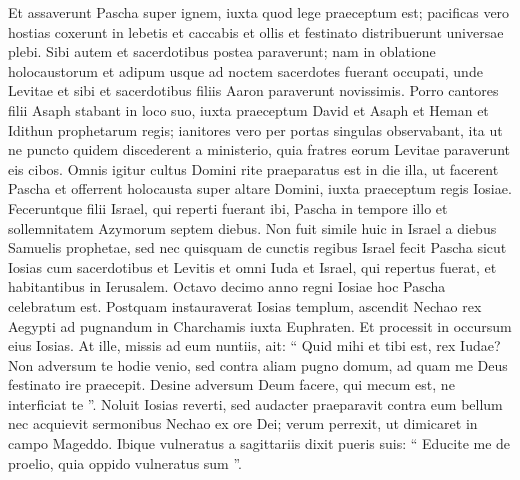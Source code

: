 \begin{biblechapter}
\begin{biblechapter}
\begin{biblechapter}
\begin{biblechapter}
\begin{biblechapter}
\begin{biblechapter}
\begin{biblechapter}
\begin{biblechapter}
\begin{biblechapter}
\begin{biblechapter}
\begin{biblechapter}
\begin{biblechapter}
\begin{biblechapter}
\begin{biblechapter}
\begin{biblechapter}
\begin{biblechapter}
\begin{biblechapter}
\begin{biblechapter}
\begin{biblechapter}
\begin{biblechapter}
\begin{biblechapter}
\begin{biblechapter}
\begin{biblechapter}
\begin{biblechapter}
\begin{biblechapter}
\begin{biblechapter}
\begin{biblechapter}
\begin{biblechapter}
\begin{biblechapter}
\begin{biblechapter}
\begin{biblechapter}
\begin{biblechapter}
\begin{biblechapter}
\begin{biblechapter}
\begin{biblechapter}
\verse Et assaverunt Pascha super ignem, iuxta quod lege praeceptum est; pacificas vero hostias coxerunt in lebetis et caccabis et ollis et festinato distribuerunt universae plebi. 
\verse Sibi autem et sacerdotibus postea paraverunt; nam in oblatione holocaustorum et adipum usque ad noctem sacerdotes fuerant occupati, unde Levitae et sibi et sacerdotibus filiis Aaron paraverunt novissimis. 
\verse Porro cantores filii Asaph stabant in loco suo, iuxta praeceptum David et Asaph et Heman et Idithun prophetarum regis; ianitores vero per portas singulas observabant, ita ut ne puncto quidem discederent a ministerio, quia fratres eorum Levitae paraverunt eis cibos.
 \verse Omnis igitur cultus Domini rite praeparatus est in die illa, ut facerent Pascha et offerrent holocausta super altare Domini, iuxta praeceptum regis Iosiae. 
\verse Feceruntque filii Israel, qui reperti fuerant ibi, Pascha in tempore illo et sollemnitatem Azymorum septem diebus. 
\verse Non fuit simile huic in Israel a diebus Samuelis prophetae, sed nec quisquam de cunctis regibus Israel fecit Pascha sicut Iosias cum sacerdotibus et Levitis et omni Iuda et Israel, qui repertus fuerat, et habitantibus in Ierusalem. 
\verse Octavo decimo anno regni Iosiae hoc Pascha celebratum est.
 \verse Postquam instauraverat Iosias templum, ascendit Nechao rex Aegypti ad pugnandum in Charchamis iuxta Euphraten. Et processit in occursum eius Iosias. 
\verse At ille, missis ad eum nuntiis, ait: “ Quid mihi et tibi est, rex Iudae? Non adversum te hodie venio, sed contra aliam pugno domum, ad quam me Deus festinato ire praecepit. Desine adversum Deum facere, qui mecum est, ne interficiat te ”. 
\verse Noluit Iosias reverti, sed audacter praeparavit contra eum bellum nec acquievit sermonibus Nechao ex ore Dei; verum perrexit, ut dimicaret in campo Mageddo. 
\verse Ibique vulneratus a sagittariis dixit pueris suis: “ Educite me de proelio, quia oppido vulneratus sum ”. 

\end{biblechapter}
\end{biblechapter}
\end{biblechapter}
\end{biblechapter}
\end{biblechapter}
\end{biblechapter}
\end{biblechapter}
\end{biblechapter}
\end{biblechapter}
\end{biblechapter}
\end{biblechapter}
\end{biblechapter}
\end{biblechapter}
\end{biblechapter}
\end{biblechapter}
\end{biblechapter}
\end{biblechapter}
\end{biblechapter}
\end{biblechapter}
\end{biblechapter}
\end{biblechapter}
\end{biblechapter}
\end{biblechapter}
\end{biblechapter}
\end{biblechapter}
\end{biblechapter}
\end{biblechapter}
\end{biblechapter}
\end{biblechapter}
\end{biblechapter}
\end{biblechapter}
\end{biblechapter}
\end{biblechapter}
\end{biblechapter}
\end{biblechapter}
